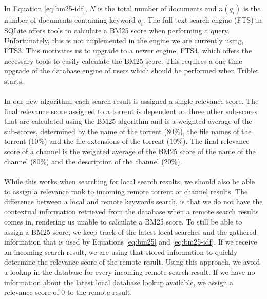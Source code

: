 \noindent In Equation \ref{eq:bm25-idf}, $ N $ is the total number of documents and $ n(q_i) $ is the number of documents containing keyword $ q_i $. The full text search engine (FTS) in SQLite offers tools to calculate a BM25 score when performing a query. Unfortunately, this is not implemented in the engine we are currently using, FTS3. This motivates us to upgrade to a newer engine, FTS4, which offers the necessary tools to easily calculate the BM25 score. This requires a one-time upgrade of the database engine of users which should be performed when Tribler starts.\\\\
In our new algorithm, each search result is assigned a single relevance score. The final relevance score assigned to a torrent is dependent on three other sub-scores that are calculated using the BM25 algorithm and is a weighted average of the sub-scores, determined by the name of the torrent (80\%), the file names of the torrent (10\%) and the file extensions of the torrent (10\%). The final relevance score of a channel is the weighted average of the BM25 score of the name of the channel (80\%) and the description of the channel (20\%).\\\\
While this works when searching for local search results, we should also be able to assign a relevance rank to incoming remote torrent or channel results. The difference between a local and remote keywords search, is that we do not have the contextual information retrieved from the database when a remote search results comes in, rendering us unable to calculate a BM25 score. To still be able to assign a BM25 score, we keep track of the latest local searches and the gathered information that is used by Equations \ref{eq:bm25} and \ref{eq:bm25-idf}. If we receive an incoming search result, we are using that stored information to quickly determine the relevance score of the remote result. Using this approach, we avoid a lookup in the database for every incoming remote search result. If we have no information about the latest local database lookup available, we assign a relevance score of 0 to the remote result.

